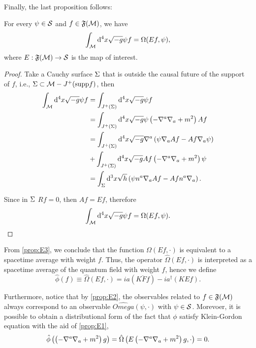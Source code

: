 Finally, the last proposition follows:
\begin{proposition}\label{prop:E3}
    For every \(\psi\in{\mathcal{S}}\) and \(f\in{\mathfrak{F}}({\mathcal{M}})\), we have
    \begin{equation}
        \int_{\mathcal{M}}\mathrm{d}^4x\sqrt{-g}\psi f=\Omega(Ef,\psi),
    \end{equation}
    where \(E:{\mathfrak{F}}({\mathcal{M}})\to{\mathcal{S}}\) is the map of interest.
\end{proposition}
\begin{proof}
    Take a Cauchy surface \(\Sigma\) that is outside the causal future of the support of \(f\), i.e., \(\Sigma\subset{\mathcal{M}}-J^+(\mathrm{supp}f)\), then
    \begin{subequations}
        \begin{align}
            \int_{\mathcal{M}}\mathrm{d}^4x\sqrt{-g}\psi f&=\int_{J^+\left(\Sigma\right)}\mathrm{d}^4x\sqrt{-g}\psi f\\
            &=\int_{J^+\left(\Sigma\right)}\mathrm{d}^4x\sqrt{-g}\psi\left(-\nabla^a\nabla_a+m^2\right) Af\\
            &=\int_{J^+\left(\Sigma\right)}\mathrm{d}^4x\sqrt{-g}\nabla^a\left(\psi\nabla_aAf-Af\nabla_a\psi\right)\\
            &+\int_{J^+\left(\Sigma\right)}\mathrm{d}^4x\sqrt{-g}Af\left(-\nabla^a\nabla_a+m^2\right)\psi\\
            &=\int_{\Sigma}\mathrm{d}^3x\sqrt{h}\left(\psi n^a\nabla_aAf-Afn^a\nabla_a\right).
        \end{align}
    \end{subequations}

    Since in \(\Sigma\) \(Rf=0\), then \(Af=Ef\), therefore
    \begin{equation}
        \int_{\mathcal{M}}\mathrm{d}^4x\sqrt{-g}\psi f=\Omega(Ef,\psi).
    \end{equation}
\end{proof}

From \cref{prop:E3}, we conclude that the function \(\Omega(Ef,\cdot)\) is equivalent to a spacetime average with weight \(f\). Thus, the operator \(\hat{\Omega}(Ef,\cdot)\) is interpreted as a spacetime average of the quantum field with weight \(f\), hence we define
\begin{equation}
    \hat{\phi}(f)\equiv\hat{\Omega}\left(Ef,\cdot\right)=ia\left(\overline{KFf}\right)-ia^{\dagger}\left(KEf\right).
\end{equation}

Furthermore, notice that by \cref{prop:E2}, the observables related to \(f\in{\mathfrak{F}}({\mathcal{M}})\) always correspond to an observable \(\hat{Omega}(\psi,\cdot)\) with \(\psi\in{\mathcal{S}}\). Morevoer, it is possible to obtain a distributional form of the fact that \(\phi\) satisfy Klein-Gordon equation with the aid of \cref{prop:E1},
\begin{equation}
    \hat{\phi}\left(\left(-\nabla^a\nabla_a+m^2\right) g\right)=\hat{\Omega}\left(E\left(-\nabla^a\nabla_a+m^2\right) g,\cdot\right)=0.
\end{equation}

